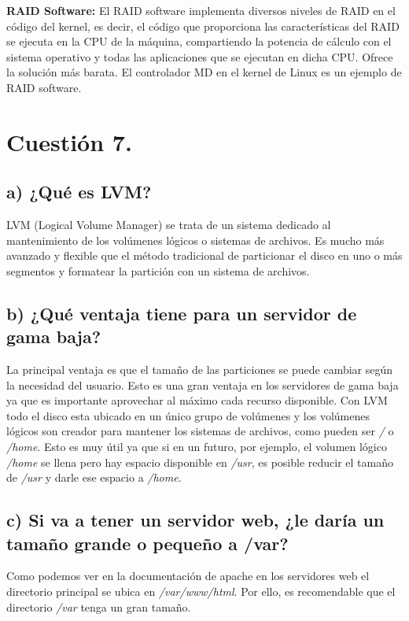 \documentclass[a4paper,titlepage,12pt]{scrartcl}	%
\numberwithin{figure}{section} %
\numberwithin{table}{section} %
\begin{document}
	\textbf{RAID Software:} El RAID software implementa diversos niveles de RAID en el código del kernel, es decir, el código que proporciona las características del RAID se ejecuta en la CPU de la máquina, compartiendo la potencia de cálculo con el sistema operativo y todas las aplicaciones que se ejecutan en dicha CPU. Ofrece la solución más barata. El controlador MD en el kernel de Linux es un ejemplo de RAID software.
	
	\section[Cuestión 7.]{Cuestión 7.}
	
	\subsection[a) ¿Qué es LVM?]{a) ¿Qué es LVM?}
	LVM (Logical Volume Manager) se trata de un sistema dedicado al mantenimiento de los volúmenes lógicos o sistemas de archivos. Es mucho más avanzado y flexible que el método tradicional de particionar el disco en uno o más segmentos y formatear la partición con un sistema de archivos. \cite{LVM}
	
	\subsection[b) ¿Qué ventaja tiene para un servidor de gama baja?]{b) ¿Qué ventaja tiene para un servidor de gama baja?}
	La principal ventaja es que el tamaño de las particiones se puede cambiar según la necesidad del usuario. Esto es una gran ventaja en los servidores de gama baja ya que es importante aprovechar al máximo cada recurso disponible. Con LVM todo el disco esta ubicado en un único grupo de volúmenes y los volúmenes lógicos son creador para mantener los sistemas de archivos, como pueden ser \textit{/} o \textit{/home}. Esto es muy útil ya que si en un futuro, por ejemplo, el volumen lógico \textit{/home} se llena pero hay espacio disponible en \textit{/usr}, es posible reducir el tamaño de \textit{/usr} y darle ese espacio a \textit{/home}. \cite{LVMGamaBaja}
	
	\subsection[c) Si va a tener un servidor web, ¿le daría un tamaño grande o pequeño a /var?]{c) Si va a tener un servidor web, ¿le daría un tamaño grande o pequeño a /var?}
	Como podemos ver en la documentación de apache \cite{varWebServer} en los servidores web el directorio principal se ubica en \textit{/var/www/html}. Por ello, es recomendable que el directorio \textit{/var} tenga un gran tamaño.
	
\end{document}
